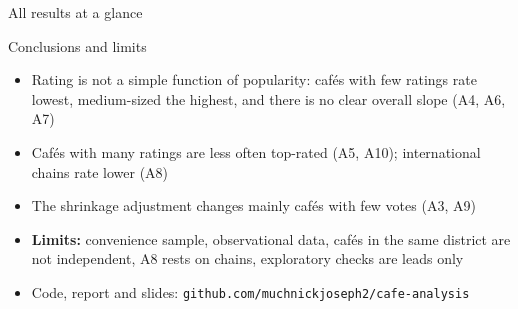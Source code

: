 \documentclass[aspectratio=169,11pt]{beamer}
\begin{document}
\begin{frame}{All results at a glance}
\centering\scriptsize
{}
\end{frame}

\begin{frame}{Conclusions and limits}
\begin{itemize}
  \item Rating is not a simple function of popularity: cafés with few ratings rate lowest, medium-sized the highest, and there is no clear overall slope (A4, A6, A7)
  \item Cafés with many ratings are less often top-rated (A5, A10); international chains rate lower (A8)
  \item The shrinkage adjustment changes mainly cafés with few votes (A3, A9)
  \item \textbf{Limits:} convenience sample, observational data, cafés in the same district are not independent, A8 rests on \NIntl{} chains, exploratory checks are leads only
  \item Code, report and slides: \texttt{github.com/muchnickjoseph2/cafe-analysis}
\end{itemize}
\end{frame}
\end{document}
